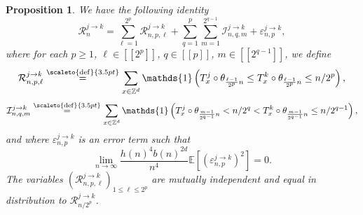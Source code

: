 \documentclass[12pt]{article}
\newcommand{\EE}{\mathbb E}
\newcommand{\1}{\mathds{1}}
\newcommand{\ZZ}{\mathbb Z}
\newcommand{\eqdef}{\stackrel{\scaleto{\mathrm{def}}{3.5pt}}{=}}
\newtheorem{proposition}{Proposition}
\numberwithin{equation}{section}
\begin{document}
\begin{proposition}
\label{proposition:decomposition of R_n^(j->k)}
    We have the following identity 
    \begin{equation}
    \label{eq:decomposition of R_n^(j->k)}
        \mathcal R_n^{j\rightarrow k}=\sum_{\ell=1}^{2^p}\mathcal R_{n,p,\ell}^{j\rightarrow k}+\sum_{q=1}^{p}\sum_{m=1}^{2^{q-1}}\mathcal I_{n,q,m}^{j\rightarrow k}+\varepsilon_{n,p}^{j\rightarrow k},
    \end{equation}
    where for each $p\ge1$, $\ell\in[\![2^p]\!]$, $q\in[\![p]\!]$, $m\in[\![2^{q-1}]\!]$, we define 
    \begin{equation}
    \label{eq:defintion of R_(n,p,ell)^(j->k)}
        \mathcal R_{n,p,\ell}^{j\rightarrow k}\eqdef\sum_{x\in\ZZ^d}\1\left(T_x^j\circ\theta_{\frac{\ell-1}{2^p}n}\le T_x^k\circ\theta_{\frac{\ell-1}{2^p}n}\le n/2^p\right),
    \end{equation}
    \begin{equation}
    \label{eq:defintion of I_(n,q,m)^(j->k)}
        \mathcal I_{n,q,m}^{j\rightarrow k}\eqdef\sum_{x\in\ZZ^d}\1\left(T_x^j\circ\theta_{\frac{m-1}{2^{q-1}}n}<n/2^q<T_x^k\circ\theta_{\frac{m-1}{2^{q-1}}n}\le n/2^{q-1}\right),
    \end{equation}
    and where $\varepsilon_{n,p}^{j\rightarrow k}$ is an error term such that 
    \begin{equation*}
        \underset{n\rightarrow\infty}\lim\frac{h(n)^4b(n)^{2d}}{n^4}\EE\left[(\varepsilon_{n,p}^{j\rightarrow k})^2\right]=0.
    \end{equation*}
    The variables $(\mathcal R_{n,p,\ell}^{j\rightarrow k})_{1\le \ell\le 2^p}$ are mutually independent and equal in distribution to $\mathcal R_{n/2^p}^{j\rightarrow k}$.
\end{proposition}
\end{document}
